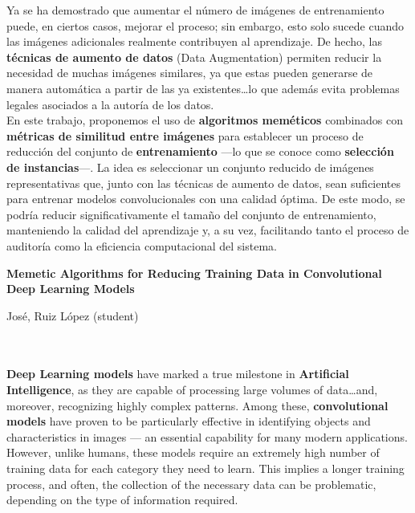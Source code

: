 Ya se ha demostrado que aumentar el número de imágenes de entrenamiento puede, en ciertos casos, mejorar el proceso;
sin embargo, esto solo sucede cuando las imágenes adicionales realmente contribuyen al aprendizaje.
De hecho, las \textbf{técnicas de aumento de datos} (Data Augmentation) permiten reducir la necesidad de muchas
imágenes similares, ya que estas pueden generarse de manera automática a partir de las ya existentes\ldots lo que además
evita problemas legales asociados a la autoría de los datos. \\[6pt]

En este trabajo, proponemos el uso de \textbf{algoritmos meméticos} combinados con
\textbf{métricas de similitud entre imágenes} para establecer un proceso de reducción del conjunto de
\textbf{entrenamiento} —lo que se conoce como \textbf{selección de instancias}—.
La idea es seleccionar un conjunto reducido de imágenes representativas que, junto con las técnicas de aumento de
datos, sean suficientes para entrenar modelos convolucionales con una calidad óptima.
De este modo, se podría reducir significativamente el tamaño del conjunto de entrenamiento, manteniendo la calidad
del aprendizaje y, a su vez, facilitando tanto el proceso de auditoría como la eficiencia computacional del sistema.
\\[6pt]


\cleardoublepage


\thispagestyle{empty}


\begin{center}
{\large\bfseries Memetic Algorithms for Reducing Training Data in Convolutional Deep Learning Models}\\
\end{center}
\begin{center}
José, Ruiz López (student)\\
\end{center}

\\

\vspace{0.7cm}
\\

\textbf{Deep Learning models} have marked a true milestone in \textbf{Artificial Intelligence}, as they are capable of
processing large volumes of data\ldots and, moreover, recognizing highly complex patterns.
Among these, \textbf{convolutional models} have proven to be particularly effective in identifying objects and
characteristics in images — an essential capability for many modern applications.
However, unlike humans, these models require an extremely high number of training data for each category they need to
learn.
This implies a longer training process, and often, the collection of the necessary data can be problematic, depending
on the type of information required. \\[6pt]

